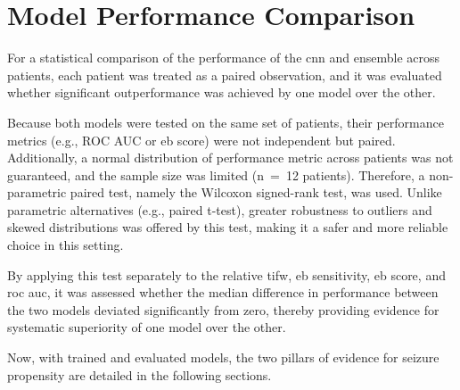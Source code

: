 \section{Model Performance Comparison}\label{sec:model-performance-comparison}
For a statistical comparison of the performance of the \gls{cnn} and ensemble across patients, each patient was treated as a paired observation, and it was evaluated whether significant outperformance was achieved by one model over the other.

Because both models were tested on the same set of patients, their performance metrics (e.g., ROC AUC or \gls{eb} score) were not independent but paired.
Additionally, a normal distribution of performance metric across patients was not guaranteed, and the sample size was limited (n~=~12 patients).
Therefore, a non-parametric paired test, namely the Wilcoxon signed-rank test, was used.
Unlike parametric alternatives (e.g., paired t-test), greater robustness to outliers and skewed distributions was offered by this test, making it a safer and more reliable choice in this setting.

By applying this test separately to the relative \gls{tifw}, \gls{eb} sensitivity, \gls{eb} score, and \gls{roc auc}, it was assessed whether the median difference in performance between the two models deviated significantly from zero, thereby providing evidence for systematic superiority of one model over the other.

Now, with trained and evaluated models, the two pillars of evidence for seizure propensity are detailed in the following sections.
